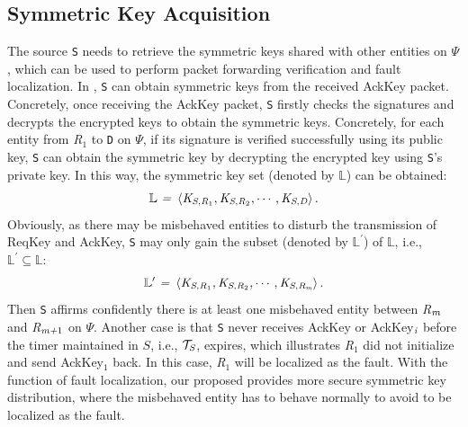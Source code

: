 \subsection{Symmetric Key Acquisition}
\label{keyacquisition}
The source {\tt S} needs to retrieve the symmetric keys shared with other entities on $\Psi$, which can be used to perform packet forwarding verification and fault localization.
In \name{}, {\tt S} can obtain symmetric keys from the received AckKey packet. Concretely, once receiving the AckKey packet, {\tt S} firstly checks the signatures and decrypts the encrypted keys to obtain the symmetric keys. Concretely, for each entity from \emph{R}$_1$ to {\tt D} on $\Psi$, if its signature is verified successfully using its public key, {\tt S} can obtain the symmetric key by decrypting the encrypted key using {\tt S}'s private key. In this way, the symmetric key set (denoted by $\mathbb{L}$) can be obtained:
\begin{equation}\label{symmetrickeyset}
\mathbb{L} ~\emph{=} ~\left \langle \emph{K}_{\emph{S},\emph{R}_1}, \emph{K}_{\emph{S},\emph{R}_2}, \cdots, \emph{K}_{\emph{S},\emph{D}} \right \rangle.
\end{equation}
\indent Obviously, as there may be misbehaved entities to disturb the transmission of ReqKey and AckKey, {\tt S} may only gain the subset (denoted by $\mathbb{L}^{\prime}$) of $\mathbb{L}$, i.e., $\mathbb{L}^{\prime}\subseteq\mathbb{L}$:
\begin{equation}\label{symmetrickeyset1}
\mathbb{L}^\prime ~\emph{=} ~\left \langle \emph{K}_{\emph{S},\emph{R}_1}, \emph{K}_{\emph{S},\emph{R}_2}, \cdots, \emph{K}_{\emph{S},\emph{R}_\emph{m}} \right \rangle.
\end{equation}
Then {\tt S} affirms confidently there is at least one misbehaved entity between \emph{R}$_\emph{m}$ and \emph{R}$_{\emph{m+}1}$ on $\Psi$. Another case is that {\tt S} never receives AckKey or AckKey$_\emph{i}$ before the timer maintained in $S$, i.e., $\mathcal{T}_\emph{S}$, expires, which illustrates \emph{R}$_1$ did not initialize and send AckKey$_1$ back. In this case, \emph{R}$_1$ will be localized as the fault. With the function of fault localization, our proposed \namekey{} provides more secure symmetric key distribution, where the misbehaved entity has to behave normally to avoid to be localized as the fault. 